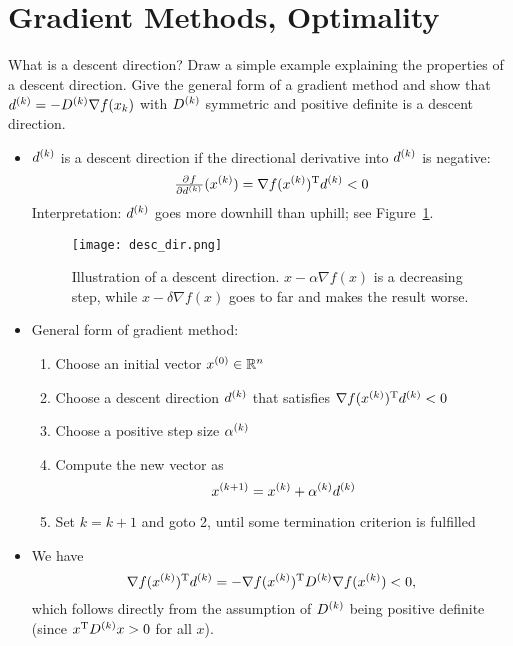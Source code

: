\documentclass{article}
\begin{document}
\section{Gradient Methods, Optimality}

\begin{question}
  What is a descent direction? Draw a simple example explaining the properties of a descent
  direction. Give the general form of a gradient method and show that
  \(\kth{d} = -\kth{D} \nabla f(x_k)\) with \(\kth{D}\) symmetric and positive definite is a descent
  direction.
\end{question}
\begin{itemize}
\item \(\kth{d}\) is a descent direction if the directional derivative into \(\kth{d}\) is negative:
  \begin{equation*}
    \pd{f}{{\kth{d}}}(\kth{x}) = \T{\nabla f(\kth{x})} \kth{d} < 0
  \end{equation*}
  Interpretation: \(\kth{d}\) goes more downhill than uphill; see Figure~\ref{fig:desc_dir}.
  \begin{figure}[H]
    \centering
    \texttt{[image: desc\_dir.png]}
    \caption{Illustration of a descent direction.  \(x - \alpha \nabla f(x)\) is a decreasing step,
      while \(x - \delta \nabla f(x)\) goes to far and makes the result worse.\label{fig:desc_dir}}
  \end{figure}
\item General form of gradient method:
  \begin{enumerate}
  \item Choose an initial vector \(\kth[0]{x} \in \RR^n\)
  \item Choose a descent direction \(\kth{d}\) that satisfies \(\T{\nabla f(\kth{x})} \kth{d} < 0\)
  \item Choose a positive step size \(\kth{\alpha}\)
  \item Compute the new vector as
  \begin{equation*}
    \kth[k+1]{x} = \kth{x} + \kth{\alpha} \kth{d}
  \end{equation*}
  \item Set \(k = k + 1\) and goto 2, until some termination criterion is fulfilled
\end{enumerate}
\item We have
  \begin{equation*}
    \T{\nabla f(\kth{x})} \kth{d} = -\T{\nabla f(\kth{x})} \kth{D} \nabla f(\kth{x}) < 0,
  \end{equation*}
  which follows directly from the assumption of \(\kth{D}\) being positive definite (since
  \(\T{x}\kth{D}x > 0\) for all \(x\)). 
\end{itemize}
\end{document}
